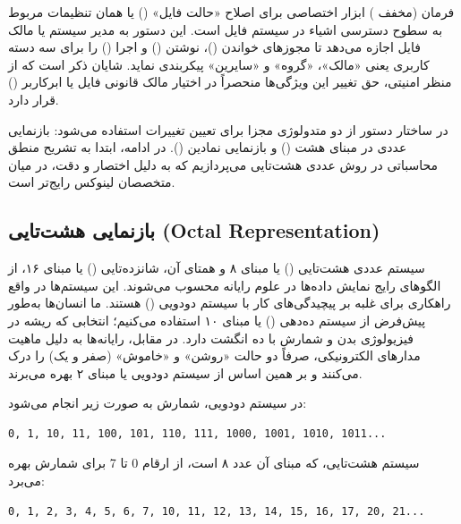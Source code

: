 فرمان  (مخفف ) ابزار اختصاصی برای اصلاح «حالت فایل» () یا همان تنظیمات مربوط به سطوح دسترسی اشیاء در سیستم فایل است. این دستور به مدیر سیستم یا مالک فایل اجازه می‌دهد تا مجوزهای خواندن ()، نوشتن () و اجرا () را برای سه دسته کاربری یعنی «مالک»، «گروه» و «سایرین» پیکربندی نماید. شایان ذکر است که از منظر امنیتی، حق تغییر این ویژگی‌ها منحصراً در اختیار مالک قانونی فایل یا ابرکاربر () قرار دارد.

در ساختار دستور  از دو متدولوژی مجزا برای تعیین تغییرات استفاده می‌شود: بازنمایی عددی در مبنای هشت () و بازنمایی نمادین (). در ادامه، ابتدا به تشریح منطق محاسباتی در روش عددی هشت‌تایی می‌پردازیم که به دلیل اختصار و دقت، در میان متخصصان لینوکس رایج‌تر است.

\subsection{بازنمایی هشت‌تایی (Octal Representation)}

سیستم عددی هشت‌تایی () یا مبنای ۸ و همتای آن، شانزده‌تایی () یا مبنای ۱۶، از الگوهای رایج نمایش داده‌ها در علوم رایانه محسوب می‌شوند. این سیستم‌ها در واقع راهکاری برای غلبه بر پیچیدگی‌های کار با سیستم دودویی () هستند. ما انسان‌ها به‌طور پیش‌فرض از سیستم ده‌دهی () یا مبنای ۱۰ استفاده می‌کنیم؛ انتخابی که ریشه در فیزیولوژی بدن و شمارش با ده انگشت دارد. در مقابل، رایانه‌ها به دلیل ماهیت مدارهای الکترونیکی، صرفاً دو حالت «روشن» و «خاموش» (صفر و یک) را درک می‌کنند و بر همین اساس از سیستم دودویی یا مبنای ۲ بهره می‌برند.

در سیستم دودویی، شمارش به صورت زیر انجام می‌شود:

\begin{latin}
\begin{lstlisting}
0, 1, 10, 11, 100, 101, 110, 111, 1000, 1001, 1010, 1011...
\end{lstlisting}
\end{latin}

سیستم هشت‌تایی، که مبنای آن عدد ۸ است، از ارقام 0 تا 7 برای شمارش بهره می‌برد:

\begin{latin}
\begin{lstlisting}
0, 1, 2, 3, 4, 5, 6, 7, 10, 11, 12, 13, 14, 15, 16, 17, 20, 21...
\end{lstlisting}
\end{latin}

